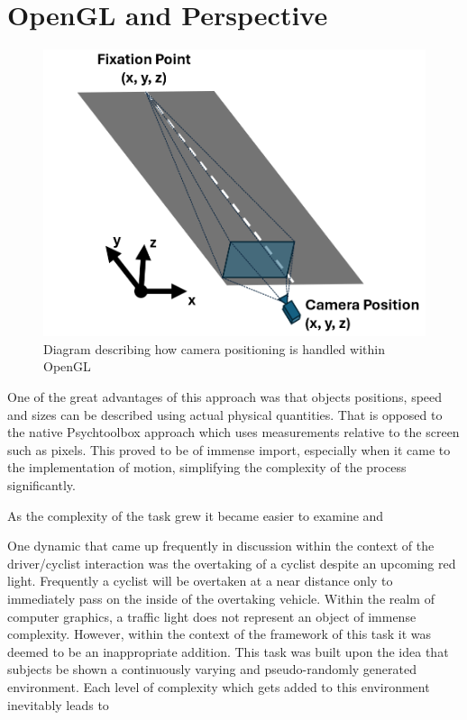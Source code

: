 \section{OpenGL and Perspective}

\begin{figure}[hbt!]
    \centering
    \includegraphics[width=0.45\linewidth]{figures/Camera Positioning.png}
    \caption{Diagram describing how camera positioning is handled within OpenGL}
    \label{fig:CameraPos}
\end{figure}



One of the great advantages of this approach was that objects positions, speed and sizes can be described using actual physical quantities. That is opposed to the native Psychtoolbox approach which uses measurements relative to the screen such as pixels. This proved to be of immense import, especially when it came to the implementation of motion, simplifying the complexity of the process significantly.

As the complexity of the task grew it became easier to examine and 

One dynamic that came up frequently in discussion within the context of the driver/cyclist interaction was the overtaking of a cyclist despite an upcoming red light. Frequently a cyclist will be overtaken at a near distance only to immediately pass on the inside of the overtaking vehicle. Within the realm of computer graphics, a traffic light does not represent an object of immense complexity. However, within the context of the framework of this task it was deemed to be an inappropriate addition. This task was built upon the idea that subjects be shown a continuously varying and pseudo-randomly generated environment. Each level of complexity which gets added to this environment inevitably leads to 


